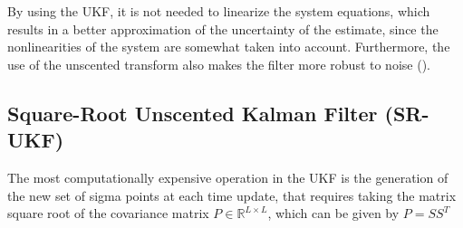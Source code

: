 \documentclass[10pt,twocolumn]{IEEEtran}
\begin{document}






By using the UKF, it is not needed to linearize the system equations, which results in a better approximation of the uncertainty of the estimate, since the nonlinearities of the system are somewhat taken into account. Furthermore, the use of the unscented transform also makes the filter more robust to noise (\cite{wan2000unscented}).

\subsection{Square-Root Unscented Kalman Filter (SR-UKF)}
\label{sec:sec2_sr_ukf}

The most computationally expensive operation in the UKF is the generation of the new set of sigma points at each time update, that requires taking the matrix square root of the covariance matrix $P \in \mathbb{R}^{L\times L}$, which can be given by $P=SS^T$




\end{document}
